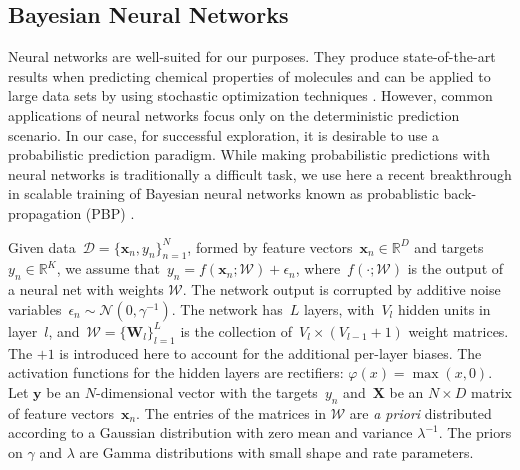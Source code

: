 \subsection{Bayesian Neural Networks}


Neural networks are well-suited for our purposes.
They produce state-of-the-art results when predicting chemical properties of molecules \cite{Ma_2015,Mayr_2016,ramsundar2015massively} and can be applied to large data sets by using stochastic optimization techniques \cite{bousquet2008tradeoffs}. However, common applications of neural networks focus only on the deterministic prediction scenario. In our case, for successful exploration, it is desirable to use a probabilistic prediction paradigm. While making probabilistic predictions with neural networks is traditionally a difficult task, we use here a recent breakthrough in scalable training of Bayesian neural networks known as probablistic back-propagation (PBP) \cite{hernandez2015probabilistic}. 

Given data~${\mathcal{D} = \{\mathbf{x}_n, y_n \}_{n=1}^N}$, formed by feature vectors~${\mathbf{x}_n \in \mathbb{R}^D}$ and targets~${y_n \in \mathbb{R}}^K$, we assume that~${y_n = f(\mathbf{x}_n;\mathcal{W}) + \epsilon_n}$,
where~$f(\cdot ;\mathcal{W})$ is the output of a neural net with weights $\mathcal{W}$. The network output is corrupted by additive noise variables~$\epsilon_n \sim \mathcal{N}(0,\gamma^{-1})$. The network has~$L$ layers, with~$V_l$ hidden units in layer~$l$, and~${\mathcal{W} = \{ \mathbf{W}_l \}_{l=1}^L}$ is the collection of~${V_l \times (V_{l-1}+1)}$ weight matrices. The $+1$ is introduced here to account for the additional per-layer biases. The activation functions for the hidden layers are rectifiers: ${\varphi(x) = \max(x,0)}$. Let $\mathbf{y}$ be an $N$-dimensional vector with the targets~$y_n$ and~$\mathbf{X}$ be an ${N\times D}$ matrix of feature vectors~$\mathbf{x}_n$. The entries of the matrices in $\mathcal{W}$ are \emph{a priori} distributed according to a Gaussian distribution with zero mean and variance $\lambda^{-1}$. The priors on $\gamma$ and $\lambda$ are Gamma distributions with small shape and rate parameters.

